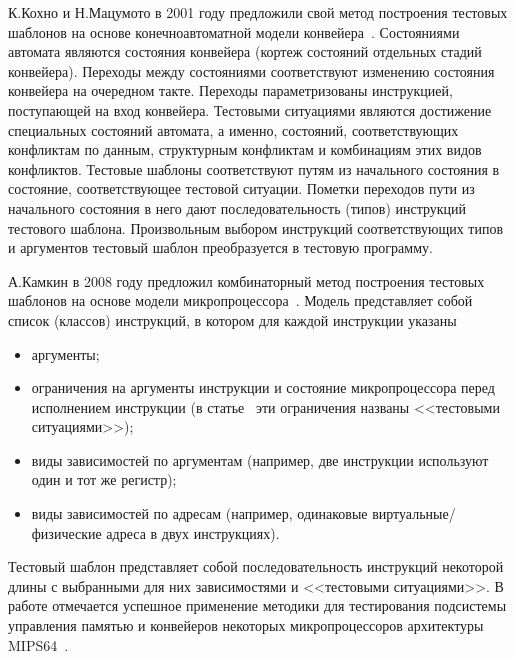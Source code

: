 
К.Кохно и Н.Мацумото в 2001 году предложили свой метод построения тестовых шаблонов на основе конечноавтоматной модели конвейера~\cite{mVpGen}. Состояниями автомата являются состояния конвейера (кортеж состояний отдельных стадий конвейера). Переходы между состояниями соответствуют изменению состояния конвейера на очередном такте. Переходы параметризованы инструкцией, поступающей на вход конвейера. Тестовыми ситуациями являются достижение специальных состояний автомата, а именно, состояний, соответствующих конфликтам по данным, структурным конфликтам и комбинациям этих видов конфликтов. Тестовые шаблоны соответствуют путям из начального состояния в состояние, соответствующее тестовой ситуации. Пометки переходов пути из начального состояния в него дают последовательность (типов) инструкций тестового шаблона. Произвольным выбором инструкций соответствующих типов и аргументов тестовый шаблон преобразуется в тестовую программу.

А.Камкин в 2008 году предложил комбинаторный метод построения тестовых шаблонов на основе модели микропроцессора~\cite{MicroTESK}. Модель представляет собой список (классов) инструкций, в котором для каждой инструкции указаны
\begin{itemize}
\item аргументы;
\item ограничения на аргументы инструкции и состояние микропроцессора перед исполнением инструкции (в статье~\cite{MicroTESK} эти ограничения названы <<тестовыми ситуациями>>);
\item виды зависимостей по аргументам (например, две инструкции используют один и тот же регистр);
\item виды зависимостей по адресам (например, одинаковые виртуальные/физические адреса в двух инструкциях).
\end{itemize}

Тестовый шаблон представляет собой последовательность инструкций некоторой длины с выбранными для них зависимостями и <<тестовыми ситуациями>>. В работе отмечается успешное применение методики для тестирования подсистемы управления памятью и конвейеров некоторых микропроцессоров архитектуры MIPS64~\cite{mips64II}.

